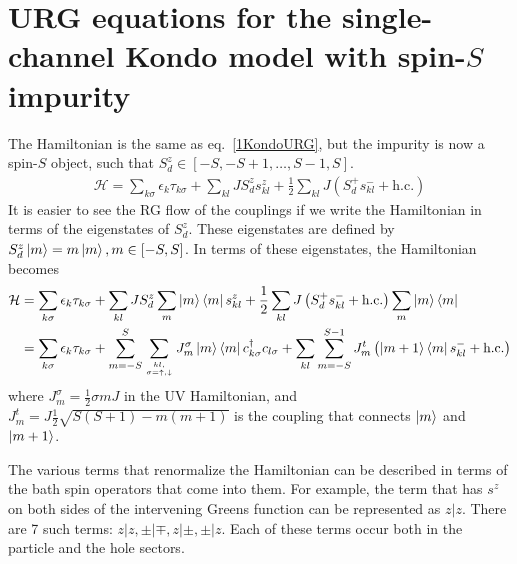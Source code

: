 \documentclass[12pt]{revtex4-2}
\begin{document}
\section{URG equations for the single-channel Kondo model with spin-\(S\) impurity}
The Hamiltonian is the same as eq.~\ref{1KondoURG}, but the impurity is now a spin-\(S\) object, such that \(S_d^z \in \left[-S, -S+1,\ldots,S-1,S\right] \).
\begin{equation}\begin{aligned}
	\mathcal{H} = \sum_{k\sigma}\epsilon_{k}\tau_{k\sigma} + \sum_{kl} J S_d^z s^z_{kl} + \frac{1}{2}\sum_{kl} J \left(S_d^+ s^-_{kl}  + \text{h.c.}\right)
\end{aligned}\end{equation}
It is easier to see the RG flow of the couplings if we write the Hamiltonian in terms of the eigenstates of \(S_d^z\). These eigenstates are defined by \(S_d^z\ket{m} = m\ket{m}, m \in \left[-S, S\right]\). In terms of these eigenstates, the Hamiltonian becomes
\begin{equation}\begin{aligned}
	\mathcal{H} &= \sum_{k\sigma}\epsilon_{k}\tau_{k\sigma} + \sum_{kl} J S_d^z\sum_m \ket{m}\bra{m} s^z_{kl} + \frac{1}{2}\sum_{kl} J \left(S_d^+ s^-_{kl}  + \text{h.c.}\right)\sum_m \ket{m}\bra{m} \\
		    &= \sum_{k\sigma}\epsilon_{k}\tau_{k\sigma} + \sum_{m=-S}^S \sum_{kl,\atop{\sigma=\uparrow,\downarrow}} J^\sigma_m \ket{m}\bra{m} c^\dagger_{k \sigma}c_{l \sigma} + \sum_{kl} \sum_{m=-S}^{S-1} J^t_{m} \left(\ket{m+1}\bra{m} s^-_{kl}  + \text{h.c.}\right)
\end{aligned}\end{equation}
where \(J^\sigma_m = \frac{1}{2} \sigma m J\) in the UV Hamiltonian, and \(J^t_{m} = J\frac{1}{2}\sqrt{S(S+1) - m(m+1)}\) is the coupling that connects \(\ket{m}\) and \(\ket{m+1}\).

The various terms that renormalize the Hamiltonian can be described in terms of the bath spin operators that come into them. For example, the term that has \(s^z\) on both sides of the intervening Greens function can be represented as \(z|z\). There are 7 such terms: \(z|z, \pm|\mp, z|\pm, \pm|z\). Each of these terms occur both in the particle and the hole sectors.
\end{document}

